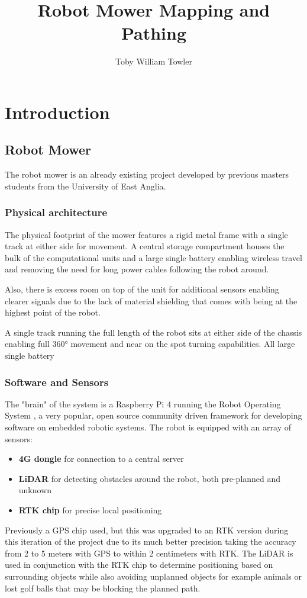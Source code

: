 \documentclass[final]{cmpreport_02}
\title{Robot Mower Mapping and Pathing}
\author{Toby William Towler}
\begin{document}
\section{Introduction}

\subsection{Robot Mower}
The robot mower is an already existing project developed by previous masters students from the University of East Anglia.

\subsubsection{Physical architecture}
The physical footprint of the mower features a rigid metal frame with a single track at either side for movement.
A central storage compartment houses the bulk of the computational units and a large single battery enabling wireless travel and removing the need for long power cables following the robot around.

Also, there is excess room on top of the unit for additional sensors enabling clearer signals due to the lack of material shielding that comes with being at the highest point of the robot.

A single track running the full length of the robot sits at either side of the chassis enabling full 360° movement and near on the spot turning capabilities.
All large single battery 


\subsubsection{Software and Sensors}
The "brain" of the system is a Raspberry Pi 4 running the Robot Operating System \citep{ros}, a very popular, open source community driven framework for developing software on embedded robotic systems.
The robot is equipped with an array of sensors:
\begin{itemize}
    \item{\textbf{4G dongle} for connection to a central server}
    \item{\textbf{LiDAR} for detecting obstacles around the robot, both pre-planned and unknown}
    \item{\textbf{RTK chip} for precise local positioning}
\end{itemize}

Previously a GPS chip used, but this was upgraded to an RTK version during this iteration of the project due to its much better precision taking the accuracy from 2 to 5 meters with GPS to within 2 centimeters with RTK.
The LiDAR is used in conjunction with the RTK chip to determine positioning based on surrounding objects while also avoiding unplanned objects for example animals or lost golf balls that may be blocking the planned path.
\end{document}
